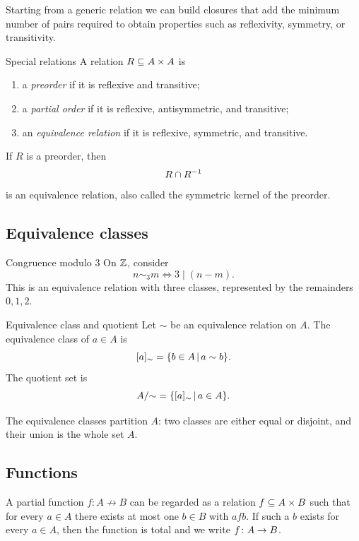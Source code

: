 \documentclass[a4paper]{article}
\begin{document}
Starting from a generic relation we can build closures that add the minimum number of pairs required to obtain properties such as reflexivity, symmetry, or transitivity.

\begin{snippetdefinition}{Special relations}
    A relation \(R\subseteq A\times A\) is
    \begin{enumerate}
        \item a \emph{preorder} if it is reflexive and transitive;
        \item a \emph{partial order} if it is reflexive, antisymmetric, and transitive;
        \item an \emph{equivalence relation} if it is reflexive, symmetric, and transitive.
    \end{enumerate}
\end{snippetdefinition}

If \(R\) is a preorder, then
\[
    R\cap R^{-1}
\]
is an equivalence relation, also called the symmetric kernel of the preorder.

\subsection{Equivalence classes}

\begin{snippetexample}{Congruence modulo \(3\)}
    On \(\mathbb{Z}\), consider
    \[
        n\sim_3 m
        \iff
        3\mid (n-m).
    \]
    This is an equivalence relation with three classes, represented by the remainders \(0,1,2\).
\end{snippetexample}

\begin{snippetdefinition}{Equivalence class and quotient}
    Let \(\sim\) be an equivalence relation on \(A\).
    The equivalence class of \(a\in A\) is
    \[
        [a]_{\sim}=\{b\in A\,|\, a\sim b\}.
    \]
    The quotient set is
    \[
        A/{\sim}=\{[a]_{\sim}\,|\, a\in A\}.
    \]
\end{snippetdefinition}

The equivalence classes partition \(A\): two classes are either equal or disjoint, and their union is the whole set \(A\).

\subsection{Functions}

A partial function \(f\colon A\not\to B\) can be regarded as a relation \(f\subseteq A\times B\) such that for every \(a\in A\) there exists at most one \(b\in B\) with \(afb\).
If such a \(b\) exists for every \(a\in A\), then the function is total and we write \(f\colon A\to B\).
\end{document}
